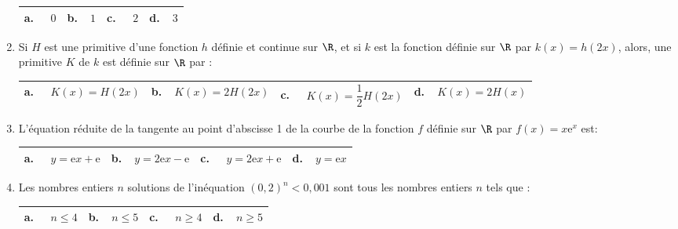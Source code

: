 \begin{enumerate}
\begin{center}
\begin{tabularx}{\linewidth}{|*{4}{X|}}\hline
\textbf{a.~~} $0$&\textbf{b.~~}$1$&\textbf{c.~~} $2$&\textbf{d.~~}$3$\\ \hline
\end{tabularx}
\end{center}

\item Si $H$ est une primitive d'une fonction $h$ définie et continue sur $\R$, 
et si $k$ est la fonction définie sur $\R$ par $k(x) = h(2x)$, 
alors, une primitive $K$ de $k$ est définie sur $\R$ par :

\begin{center}
\begin{tabularx}{\linewidth}{|*{4}{X|}}\hline
\textbf{a.~~} $K(x) =H(2x)$&\textbf{b.~~}$K(x) =2H(2x)$&\textbf{c.~~} $ K(x) =\dfrac{1}{2}H(2x)$&\textbf{d.~~}$K(x) =2H(x)$\rule[-3mm]{0mm}{9mm}\\ \hline
\end{tabularx}
\end{center}

\item L'équation réduite de la tangente au point d'abscisse 1 de la courbe de la fonction $f$ définie sur $\R$ par $f(x) = x\text{e}^x$ est:

\begin{center}
\begin{tabularx}{\linewidth}{|*{4}{X|}}\hline
\textbf{a.~~} $y = \text{e}x + \text{e}$&\textbf{b.~~}$y =2\text{e}x - \text{e}$&\textbf{c.~~} $y = 2\text{e}x +  \text{e}$&\textbf{d.~~}$y = \text{e}x$\\ \hline
\end{tabularx}
\end{center}

\item Les nombres entiers $n$ solutions de l'inéquation $(0,2)^n < 0,001$ sont tous les
nombres entiers $n$ tels que :

\begin{center}
\begin{tabularx}{\linewidth}{|*{4}{X|}}\hline
\textbf{a.~~} $n \leqslant 4$&\textbf{b.~~}$n\leqslant 5$&\textbf{c.~~} $n \geqslant 4$ &\textbf{d.~~}$n \geqslant 5$\\ \hline
\end{tabularx}
\end{center}

\end{enumerate}

\bigskip
